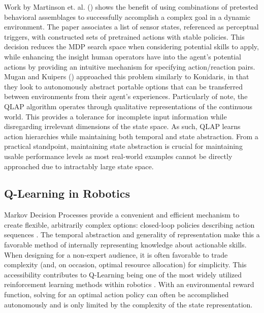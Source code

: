\documentclass[letterpaper]{article}
\begin{document}
  Work by Martinson et. al. (\citeyear{QLBehaviorSelection}) shows the benefit of using combinations of pretested behavioral assemblages to successfully accomplish a complex goal in a dynamic environment. The paper associates a list of sensor states, referenced as perceptual triggers, with constructed sets of pretrained actions with stable policies. This decision reduces the MDP search space when considering potential skills to apply, while enhancing the insight human operators have into the agent's potential actions by providing an intuitive mechanism for specifying action/reaction pairs. Mugan and Kuipers (\citeyear{AutoHierarchyLearning}) approached this problem similarly to Konidaris, in that they look to autonomously abstract portable options that can be transferred between environments from their agent's experiences. Particularly of note, the QLAP algorithm operates through qualitative representations of the continuous world. This provides a tolerance for incomplete input information while disregarding irrelevant dimensions of the state space. As such, QLAP learns action hierarchies while maintaining both temporal and state abstraction. From a practical standpoint, maintaining state abstraction is crucial for maintaining usable performance levels as most real-world examples cannot be directly approached due to intractably large state space.

\subsection{Q-Learning in Robotics}
  Markov Decision Processes provide a convenient and efficient mechanism to create flexible, arbitrarily complex options: closed-loop policies describing action sequences \cite{SuttonMDP}. The temporal abstraction and generality of representation make this a favorable method of internally representing knowledge about actionable skills. When designing for a non-expert audience, it is often favorable to trade complexity (and, on occasion, optimal resource allocation) for simplicity. This accessibility contributes to Q-Learning being one of the most widely utilized reinforcement learning methods within robotics \cite{QLearningWatkins}. With an environmental reward function, solving for an optimal action policy can often be accomplished autonomously and is only limited by the complexity of the state representation.
\end{document}
